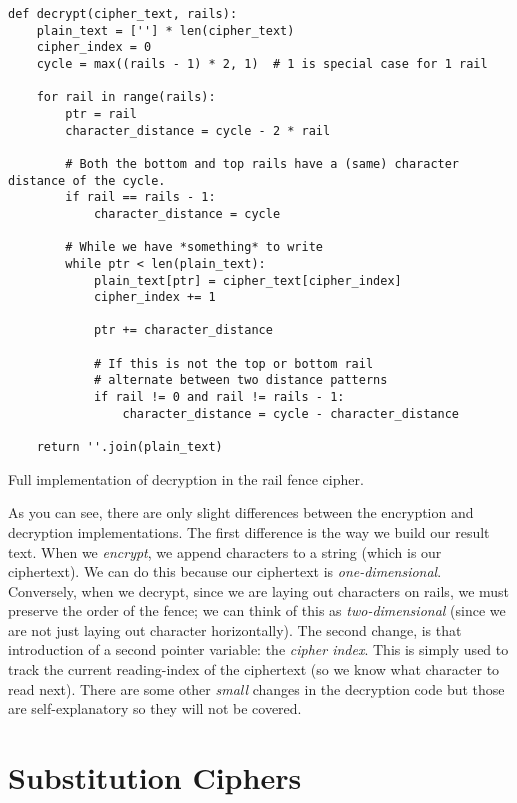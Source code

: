 \begin{listing}[H]
    \begin{verbatim}
def decrypt(cipher_text, rails):
    plain_text = [''] * len(cipher_text)
    cipher_index = 0
    cycle = max((rails - 1) * 2, 1)  # 1 is special case for 1 rail
    
    for rail in range(rails):
        ptr = rail
        character_distance = cycle - 2 * rail
    
        # Both the bottom and top rails have a (same) character distance of the cycle. 
        if rail == rails - 1:
            character_distance = cycle
    
        # While we have *something* to write
        while ptr < len(plain_text):
            plain_text[ptr] = cipher_text[cipher_index]
            cipher_index += 1
                
            ptr += character_distance
            
            # If this is not the top or bottom rail
            # alternate between two distance patterns  
            if rail != 0 and rail != rails - 1:
                character_distance = cycle - character_distance
    
    return ''.join(plain_text)
        \end{verbatim}
        \caption{Full implementation of decryption in the rail fence cipher.}
\end{listing}

As you can see, there are only slight differences between the encryption and decryption implementations. The first difference is the
way we build our result text. When we \textit{encrypt}, we append characters to a string (which is our ciphertext). We can do this because
our ciphertext is \textit{one-dimensional}. Conversely, when we decrypt, since we are laying out characters on rails, we must preserve the order of the
fence; we can think of this as \textit{two-dimensional} (since we are not just laying out character horizontally). 
The second change, is that introduction of a second pointer variable: the \textit{cipher index}. 
This is simply used to track the current reading-index of the ciphertext (so we know what character to read next). 
There are some other \textit{small} changes in the decryption code but those are self-explanatory so they will not be covered.

\section{Substitution Ciphers}

